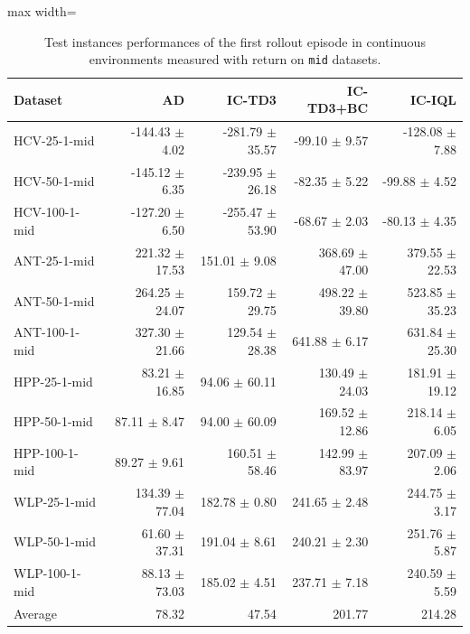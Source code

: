 \documentclass{article}
\begin{document}
\begin{table}[ht]
    \label{tab:}
    \begin{center}
    \caption{Test instances performances of the first rollout episode in continuous environments measured with return on \texttt{mid} datasets.}
    \begin{small}
    \begin{adjustbox}{max width=\columnwidth}
		\begin{tabular}{l|rrrr}
		\toprule
	\textbf{Dataset} & \textbf{AD} & \textbf{IC-TD3} & \textbf{IC-TD3+BC} & \textbf{IC-IQL}\\
\midrule
HCV-25-1-mid & -144.43 $\pm$ 4.02 & -281.79 $\pm$ 35.57 & -99.10 $\pm$ 9.57 & -128.08 $\pm$ 7.88\\
HCV-50-1-mid & -145.12 $\pm$ 6.35 & -239.95 $\pm$ 26.18 & -82.35 $\pm$ 5.22 & -99.88 $\pm$ 4.52\\
HCV-100-1-mid & -127.20 $\pm$ 6.50 & -255.47 $\pm$ 53.90 & -68.67 $\pm$ 2.03 & -80.13 $\pm$ 4.35\\
ANT-25-1-mid & 221.32 $\pm$ 17.53 & 151.01 $\pm$ 9.08 & 368.69 $\pm$ 47.00 & 379.55 $\pm$ 22.53\\
ANT-50-1-mid & 264.25 $\pm$ 24.07 & 159.72 $\pm$ 29.75 & 498.22 $\pm$ 39.80 & 523.85 $\pm$ 35.23\\
ANT-100-1-mid & 327.30 $\pm$ 21.66 & 129.54 $\pm$ 28.38 & 641.88 $\pm$ 6.17 & 631.84 $\pm$ 25.30\\
HPP-25-1-mid & 83.21 $\pm$ 16.85 & 94.06 $\pm$ 60.11 & 130.49 $\pm$ 24.03 & 181.91 $\pm$ 19.12\\
HPP-50-1-mid & 87.11 $\pm$ 8.47 & 94.00 $\pm$ 60.09 & 169.52 $\pm$ 12.86 & 218.14 $\pm$ 6.05\\
HPP-100-1-mid & 89.27 $\pm$ 9.61 & 160.51 $\pm$ 58.46 & 142.99 $\pm$ 83.97 & 207.09 $\pm$ 2.06\\
WLP-25-1-mid & 134.39 $\pm$ 77.04 & 182.78 $\pm$ 0.80 & 241.65 $\pm$ 2.48 & 244.75 $\pm$ 3.17\\
WLP-50-1-mid & 61.60 $\pm$ 37.31 & 191.04 $\pm$ 8.61 & 240.21 $\pm$ 2.30 & 251.76 $\pm$ 5.87\\
WLP-100-1-mid & 88.13 $\pm$ 73.03 & 185.02 $\pm$ 4.51 & 237.71 $\pm$ 7.18 & 240.59 $\pm$ 5.59\\
\midrule
Average & 78.32 & 47.54 & 201.77 & 214.28\\
\end{tabular}
        \end{adjustbox}
    \end{small}
    \end{center}
    \vskip -0.1in
\end{table}
\end{document}
